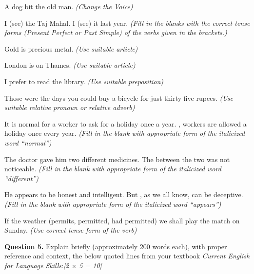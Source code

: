 \documentclass[11pt,a4paper]{article}
\newcommand{\pts}[1]{\hfill   \textit{[#1]}}
\begin{document}
\begin{parts}
  \item A dog bit the old man.   \textit{(Change the Voice)}
  \item I \underline{\hspace{2cm}} (see) the Taj Mahal. I \underline{\hspace{2cm}} (see) it last year.   \textit{(Fill in the blanks with the correct tense forms (Present Perfect or Past Simple) of the verbs given in the brackets.)}
  \item Gold is \underline{\hspace{2cm}} precious metal.   \textit{(Use suitable article)}
  \item London is on \underline{\hspace{2cm}} Thames.   \textit{(Use suitable article)}
  \item I prefer to read \underline{\hspace{2cm}} the library.   \textit{(Use suitable preposition)}
  \item Those were the days \underline{\hspace{2cm}} you could buy a bicycle for just thirty five rupees.   \textit{(Use suitable relative pronoun or relative adverb)}
  \item It is normal for a worker to ask for a holiday once a year. \underline{\hspace{2.5cm}}, workers are allowed a holiday once every year.   \textit{(Fill in the blank with appropriate form of the italicized word ``normal'')}
  \item The doctor gave him two different medicines. The \underline{\hspace{2.5cm}} between the two was not noticeable.   \textit{(Fill in the blank with appropriate form of the italicized word ``different'')}
  \item He appears to be honest and intelligent. But \underline{\hspace{2.5cm}}, as we all know, can be deceptive.   \textit{(Fill in the blank with appropriate form of the italicized word ``appears'')}
  \item If the weather \underline{\hspace{2.5cm}} (permits, permitted, had permitted) we shall play the match on Sunday.   \textit{(Use correct tense form of the verb)}
\end{parts}

\bigskip




\noindent   \textbf{Question 5.} Explain briefly (approximately 200 words each), with proper reference and context, the below quoted lines from your textbook   \textit{Current English for Language Skills}:\pts{2 $ \times$ 5 = 10}
\end{document}
